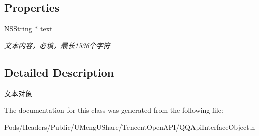 \subsection*{Properties}
\begin{DoxyCompactItemize}
\item 
\mbox{\label{interface_q_q_api_text_object_a800ffbfdf7dee6f106893e57ef676beb}} 
N\+S\+String $\ast$ \mbox{\hyperlink{interface_q_q_api_text_object_a800ffbfdf7dee6f106893e57ef676beb}{text}}
\begin{DoxyCompactList}\small\item\em 文本内容，必填，最长1536个字符 \end{DoxyCompactList}\end{DoxyCompactItemize}


\subsection{Detailed Description}
文本对象 

The documentation for this class was generated from the following file\+:\begin{DoxyCompactItemize}
\item 
Pods/\+Headers/\+Public/\+U\+Meng\+U\+Share/\+Tencent\+Open\+A\+P\+I/Q\+Q\+Api\+Interface\+Object.\+h\end{DoxyCompactItemize}
